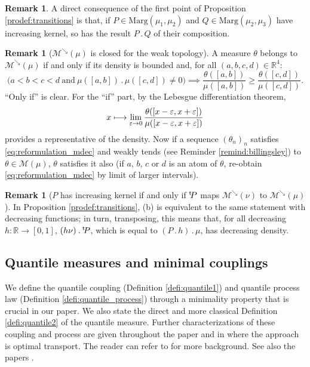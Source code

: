 \documentclass[JEP,XML,SOM,Unicode,NoEqCountersInSection,NoFloatCountersInSection,published]{cedram}
\newcommand{\ldot}{\mathbin{.}}
\newcommand\mto{\mathchoice{\longmapsto}{\mapsto}{\mapsto}{\mapsto}}
\theoremstyle{plain}
\theoremstyle{definition}
\newtheorem{rem}[them]{Remark}
\newcommand{\trans}{{}^{\mathrm{t}}\mkern-1mu}
\let\eps\varepsilon
\newcommand{\m}{\mathcal{M}}
\newcommand{\ma}{\mathrm{Marg}}
\newcommand{\R}{\mathbb{R}}
\newcommand{\mdec}{\mathcal{M}^{\scriptscriptstyle\searrow}}
\begin{document}
\begin{rem}\label{rem:transitions_croissantes_composee} A direct consequence of the first point of Proposition \ref{prodef:transitions} is that, if $P\in\ma(\mu_1,\mu_2)$ and $Q\in\ma(\mu_2,\mu_3)$ have increasing kernel, so has the result $P\ldot Q$ of their composition.
\end{rem}

\begin{rem}[$\mdec(\mu)$ is closed for the weak topology]\label{rem:mdec} A measure $\theta$ belongs to $\mdec(\mu)$ if and only if its density is bounded and, for all $(a,b,c,d)\in\R^4$:
\begin{equation}\label{eq:reformulation_mdec}
\bigl(a<b<c<d\ \text{and}\ \mu([a,b])\ldot\mu([c,d])\neq0\bigr)\implies \frac{\theta([a,b])}{\mu([a,b])}\geqslant \frac{\theta([c,d])}{\mu([c,d])}.
\end{equation}
``Only if'' is clear. For the ``if'' part, by the Lebesgue differentiation theorem,
\[
x\mto\lim_{\eps\to0}\frac{\theta([x-\varepsilon,x+\varepsilon])}{\mu([x-\varepsilon,x+\varepsilon])}
\]
provides a representative of the density. Now if a sequence $(\theta_n)_n$ satisfies \eqref{eq:reformulation_mdec} and weakly tends (see Reminder \ref{remind:billingsley}) to $\theta\in\m(\mu)$, $\theta$ satisfies it also (if $a$, $b$, $c$ or $d$ is an atom of $\theta$, re-obtain \eqref{eq:reformulation_mdec} by limit of larger intervals).
\end{rem}

\begin{rem}[$P$ has increasing kernel if and only if $\trans\!P$ maps $\mdec(\nu)$ to $\mdec(\mu)$]\label{rem:stable}
In Proposition \ref{prodef:transitions}, (b) is equivalent to the same statement with decreasing functions; in turn, transposing, this means that, for all decreasing $h:\R\to[0,1]$, $(h\nu)\ldot\trans\!P$, which is equal to $(P\ldot h)\ldot\mu$, has decreasing density.
\end{rem}

\subsection{Quantile measures and minimal couplings}\label{ss:minimality}
We define the quantile coupling (Definition \ref{defi:quantile1}) and quantile process law (Definition \ref{defi:quantile_process}) through a minimality property that is crucial in our paper. We also state the direct and more classical Definition \ref{defi:quantile2} of the quantile measure. Further characterizations of these coupling and process are given throughout the paper and in \cite{BouJui2} where the approach is optimal transport. The reader can refer to \cite{RR, Vi1} for more background. See also the papers \cite{Ju_seminaire, Pass}.
\end{document}
